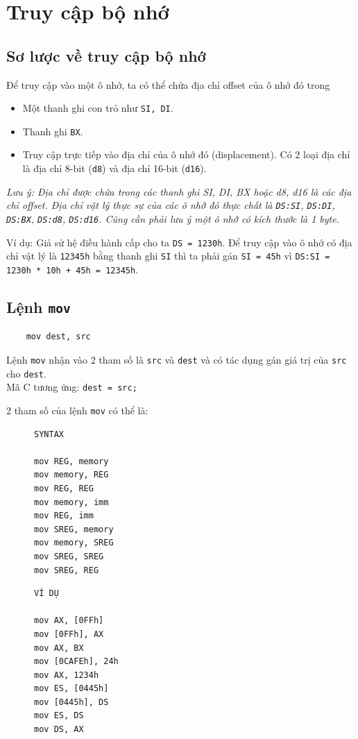 \documentclass[12pt]{report}
\newcommand{\code}[1]{\texttt{#1}}
\begin{document}
\section{Truy cập bộ nhớ}
\subsection{Sơ lược về truy cập bộ nhớ}
Để truy cập vào một ô nhớ, ta có thể chứa địa chỉ offset của ô nhớ đó trong
\begin{itemize}
    \item Một thanh ghi con trỏ như \code{SI, DI}.
    \item Thanh ghi \code{BX}.
    \item Truy cập trực tiếp vào địa chỉ của ô nhớ đó (displacement). Có 2 loại địa chỉ là địa chỉ 8-bit (\code{d8}) và địa chỉ 16-bit (\code{d16}).
\end{itemize}

\textit{Lưu ý: Địa chỉ được chứa trong các thanh ghi SI, DI, BX hoặc d8, d16 là các địa chỉ offset. Địa chỉ vật lý thực sự của các ô nhớ đó thực chất là \code{DS:SI}, \code{DS:DI}, \code{DS:BX}, \code{DS:d8}, \code{DS:d16}. Cũng cần phải lưu ý một ô nhớ có kích thước là 1 byte}.
\bigskip

Ví dụ: Giả sử hệ điều hành cấp cho ta \code{DS = 1230h}.
Để truy cập vào ô nhớ có địa chỉ vật lý là \code{12345h} bằng thanh ghi \code{SI} thì ta phải gán \code{SI = 45h} vì \code{DS:SI = 1230h * 10h + 45h = 12345h}.

\subsection{Lệnh \code{mov}}
\begin{verbatim}
    mov dest, src
\end{verbatim}
Lệnh \code{mov} nhận vào 2 tham số là \code{src} và \code{dest} và có tác dụng gán giá trị của \code{src} cho \code{dest}.\\
Mã C tương ứng: \code{dest = src;}

2 tham số của lệnh \code{mov} có thể là:
\begin{figure}[H]
    \begin{minipage}{0.5\textwidth}
\begin{verbatim}
SYNTAX 

mov REG, memory
mov memory, REG
mov REG, REG
mov memory, imm
mov REG, imm
mov SREG, memory
mov memory, SREG 
mov SREG, SREG 
mov SREG, REG
\end{verbatim}
    \end{minipage}
    \hfill
        \begin{minipage}{0.5\textwidth}
\begin{verbatim}
VÍ DỤ 

mov AX, [0FFh]
mov [0FFh], AX
mov AX, BX
mov [0CAFEh], 24h
mov AX, 1234h
mov ES, [0445h]
mov [0445h], DS 
mov ES, DS 
mov DS, AX
\end{verbatim}         
         \end{minipage}
\end{figure}
\end{document}
